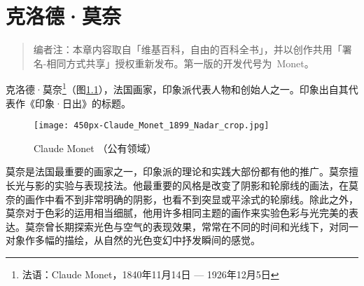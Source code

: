 %
%
%
%
%
%
%
%
%
\chapter{克洛德·莫奈}

\begin{quotation}
    编者注：本章内容取自「维基百科，自由的百科全书」，并以创作共用「署名-相同方式共享」授权重新发布。\xjtuthesis 第一版的开发代号为~Monet。
\end{quotation}

    克洛德·莫奈\footnote{法语：Claude Monet，1840年11月14日 --- 1926年12月5日}（图\ref{fig:claude-monet}），法国画家，印象派代表人物和创始人之一。印象出自其代表作《印象·日出》的标题。

    \begin{figure}[h!]
      \centering
      \texttt{[image: 450px-Claude\_Monet\_1899\_Nadar\_crop.jpg]}
      \caption{Claude Monet （公有领域）}
      \label{fig:claude-monet}
    \end{figure}

    莫奈是法国最重要的画家之一，印象派的理论和实践大部份都有他的推广。莫奈擅长光与影的实验与表现技法。他最重要的风格是改变了阴影和轮廓线的画法，在莫奈的画作中看不到非常明确的阴影，也看不到突显或平涂式的轮廓线。除此之外，莫奈对于色彩的运用相当细腻，他用许多相同主题的画作来实验色彩与光完美的表达。莫奈曾长期探索光色与空气的表现效果，常常在不同的时间和光线下，对同一对象作多幅的描绘，从自然的光色变幻中抒发瞬间的感觉。

